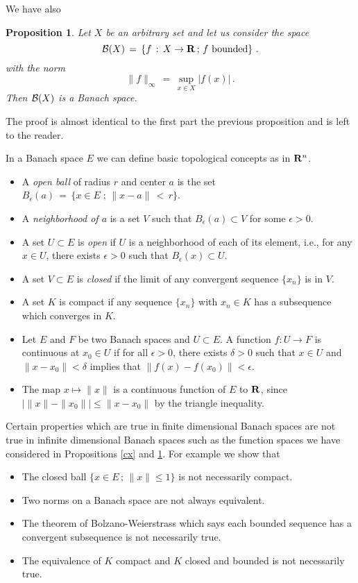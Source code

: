 \documentclass[12pt]{report}
\newcommand{\calB}{{\cal B}}
\newcommand{\bR}{{\bf R}}
\newtheorem{prop}[theorem]{Proposition}
\newcommand{\proof}{\noindent {\em Proof:~}}
\def\to{\rightarrow}
\begin{document}
We have also 
\begin{prop}\label{bx}  
Let $X$ be an arbitrary set and let us consider the space   
\begin{equation}
\calB (X)\,=\, \left\{ f\,:\, X  \to \bR \,;\, f {\rm ~bounded} \right\} \,.
\end{equation}
with the norm 
\begin{equation}
\|f\|_\infty \,=\, \sup_{x \in X} |f(x)| \,.
\end{equation}
Then $\calB(X)$ is a Banach space.  
\end{prop}

\proof The proof is almost identical to the first part the previous
proposition and is left to the reader.


In a Banach space $E$ we can define basic topological concepts as in $\bR^n$. 
\begin{itemize}
\item A {\em open ball} of radius $r$ and center $a$ is the set
$B_\epsilon(a)\,=\,\{ x \in E \;;\, \|x-a\| \,<\, r\}$.
\item A {\em neighborhood of $a$} is a set $V$ such that $B_\epsilon(a)
\subset V$ for some $\epsilon >0$.
\item A set $U \subset E$ is {\em open} if $U$ is a neighborhood of
each of its element, i.e., for any $x \in U$, there exists $\epsilon
>0$ such that $B_\epsilon(x) \subset U$.
\item A set $V \subset E$ is {\em closed} if the limit of any convergent
sequence $\{x_n\}$ is in $V$.
\item A set $K$ is compact if any sequence $\{x_n\}$ with $x_n \in K$ 
has a subsequence which converges in $K$.
\item Let $E$ and $F$ be two Banach spaces and $U \subset E$. A
function $f: U \to F$ is continuous at $x_0 \in U$ if for all $\epsilon
> 0$, there exists $\delta >0$ such that $x \in U$ and $\|x -
x_0\| < \delta$ implies that $\|f(x) - f(x_0)\| < \epsilon$.
\item The map $x \mapsto \|x \|$ is a continuous function of $E$ to
$\bR$, since $\left| \|x\| -\|x_0\| \right| \le \|x - x_0\|$ by the
triangle inequality.
\end{itemize}
Certain properties which are true in finite dimensional Banach spaces
are not true in infinite dimensional Banach spaces such as the
function spaces we have considered in Propositions \ref{cx} and
\ref{bx}.  For example we show that
\begin{itemize}
\item The closed ball $\{ x \in E \,;\, \|x\| \le 1\}$ is not 
necessarily compact. 
\item Two norms on a Banach space are not always equivalent. 
\item The theorem of Bolzano-Weierstrass which says each bounded
sequence has a convergent subsequence is not necessarily true.
\item The equivalence of $K$ compact and $K$ closed and bounded is not
necessarily true.
\end{itemize}
\end{document}

